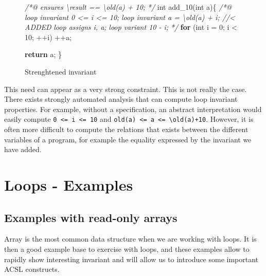 \documentclass[12pt,francais,]{scrbook}
\newenvironment{Shaded}{}{}
\newcommand{\KeywordTok}[1]{\textcolor[rgb]{0.00,0.44,0.13}{\textbf{{#1}}}}
\newcommand{\DataTypeTok}[1]{\textcolor[rgb]{0.56,0.13,0.00}{{#1}}}
\newcommand{\DecValTok}[1]{\textcolor[rgb]{0.25,0.63,0.44}{{#1}}}
\newcommand{\CommentTok}[1]{\textcolor[rgb]{0.38,0.63,0.69}{\textit{{#1}}}}
\newcommand{\NormalTok}[1]{{#1}}
\newenvironment{zdsblock}[1]{%
  \tcolorbox[beamer,%
    noparskip,breakable,
    colback=LightBlue,colframe=DarkBlue,%
    colbacklower=DarkBlue,%
    title=#1]
}{\endtcolorbox}
\begin{document}
\begin{figure}
\begin{footnotesize}\begin{Shaded}
\begin{Highlighting}[]
\CommentTok{/*@}
\CommentTok{    ensures \textbackslash{}result == \textbackslash{}old(a) + 10;}
\CommentTok{*/}
\DataTypeTok{int} \NormalTok{add_10(}\DataTypeTok{int} \NormalTok{a)\{}
    \CommentTok{/*@}
\CommentTok{        loop invariant 0 <= i <= 10;}
\CommentTok{        loop invariant a = \textbackslash{}old(a) + i; //< ADDED}
\CommentTok{        loop assigns i, a;}
\CommentTok{        loop variant 10 - i;}
\CommentTok{    */}
    \KeywordTok{for} \NormalTok{(}\DataTypeTok{int} \NormalTok{i = }\DecValTok{0}\NormalTok{; i < }\DecValTok{10}\NormalTok{; ++i)}
        \NormalTok{++a;}

    \KeywordTok{return} \NormalTok{a;}
\NormalTok{\}}
\end{Highlighting}
\end{Shaded}\end{footnotesize}
\caption{Strenghtened invariant}
\label{fig:4-3-4-comp_inv}
\end{figure}

\begin{zdsblock}{Information}
  This need can appear as a very strong constraint. This is not really the
  case. There exists strongly automated analysis that can compute loop
  invariant properties. For example, without a specification, an abstract
  interpretation would easily compute \texttt{0\ \textless{}=\ i\ \textless{}=\ 10}
  and \texttt{old(a)\ \textless{}=\ a\ \textless{}=\ \textbackslash{}old(a)+10}.
  However, it is often more difficult to compute the relations
  that exists between the different variables of a program, for
  example the equality expressed by the invariant we have
  added.
\end{zdsblock}

\section{Loops - Examples}\label{loops---examples}

\subsection{Examples with read-only
arrays}\label{examples-with-read-only-arrays}

Array is the most common data structure when we are working with loops.
It is then a good example base to exercise with loops, and these
examples allow to rapidly show interesting invariant and will allow us
to introduce some important ACSL constructs.
\end{document}
